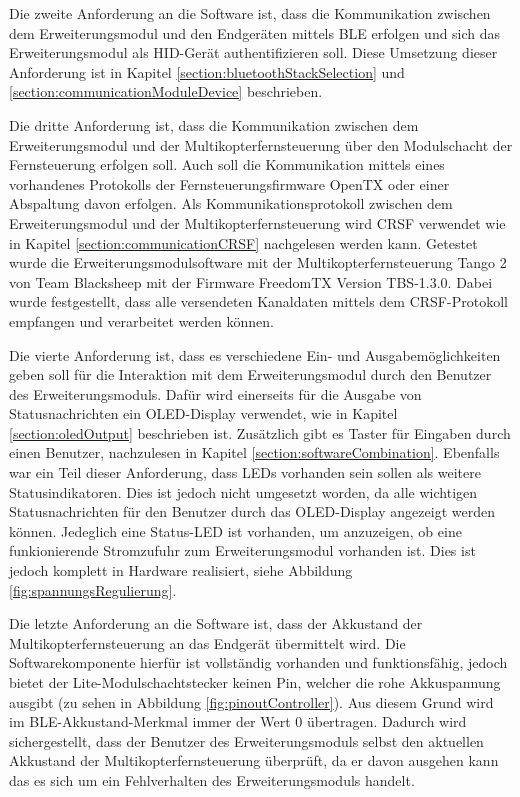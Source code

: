 Die zweite Anforderung an die Software ist, dass die Kommunikation zwischen dem Erweiterungsmodul und den Endgeräten mittels \ac{BLE} erfolgen und sich das Erweiterungsmodul als HID-Gerät authentifizieren soll. Diese Umsetzung dieser Anforderung ist in Kapitel \ref{section:bluetoothStackSelection} und \ref{section:communicationModuleDevice} beschrieben.

Die dritte Anforderung ist, dass die Kommunikation zwischen dem Erweiterungsmodul und der Multikopterfernsteuerung über den Modulschacht der Fernsteuerung erfolgen soll. Auch soll die Kommunikation mittels eines vorhandenes Protokolls der Fernsteuerungsfirmware OpenTX oder einer Abspaltung davon erfolgen. Als Kommunikationsprotokoll zwischen dem Erweiterungsmodul und der Multikopterfernsteuerung wird CRSF verwendet wie in Kapitel \ref{section:communicationCRSF} nachgelesen werden kann. Getestet wurde die Erweiterungsmodulsoftware mit der Multikopterfernsteuerung Tango 2 von Team Blacksheep mit der Firmware FreedomTX Version TBS-1.3.0. Dabei wurde festgestellt, dass alle versendeten Kanaldaten mittels dem CRSF-Protokoll empfangen und verarbeitet werden können.

Die vierte Anforderung ist, dass es verschiedene Ein- und Ausgabemöglichkeiten geben soll für die Interaktion mit dem Erweiterungsmodul durch den Benutzer des Erweiterungsmoduls. Dafür wird einerseits für die Ausgabe von Statusnachrichten ein \acs{OLED}-Display verwendet, wie in Kapitel \ref{section:oledOutput} beschrieben ist. Zusätzlich gibt es Taster für Eingaben durch einen Benutzer, nachzulesen in Kapitel \ref{section:softwareCombination}. Ebenfalls war ein Teil dieser Anforderung, dass \acp{LED} vorhanden sein sollen als weitere Statusindikatoren. Dies ist jedoch nicht umgesetzt worden, da alle wichtigen Statusnachrichten für den Benutzer durch das \ac{OLED}-Display angezeigt werden können. Jedeglich eine Status-\ac{LED} ist vorhanden, um anzuzeigen, ob eine funkionierende Stromzufuhr zum Erweiterungsmodul vorhanden ist. Dies ist jedoch komplett in Hardware realisiert, siehe Abbildung \ref{fig:spannungsRegulierung}.


Die letzte Anforderung an die Software ist, dass der Akkustand der Multikopterfernsteuerung an das Endgerät übermittelt wird. Die Softwarekomponente hierfür ist vollständig vorhanden und funktionsfähig, jedoch bietet der Lite-Modulschachtstecker keinen Pin, welcher die rohe Akkuspannung ausgibt (zu sehen in Abbildung \ref{fig:pinoutController}). Aus diesem Grund wird im \ac{BLE}-Akkustand-Merkmal immer der Wert 0 übertragen. Dadurch wird sichergestellt, dass der Benutzer des Erweiterungsmoduls selbst den aktuellen Akkustand der Multikopterfernsteuerung überprüft, da er davon ausgehen kann das es sich um ein Fehlverhalten des Erweiterungsmoduls handelt.


